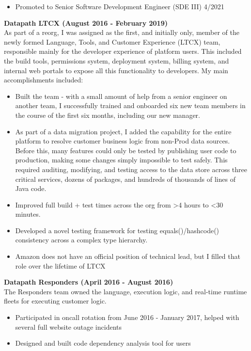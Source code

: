 \documentclass{res}
\begin{document}
\begin{resume}
\begin{itemize}
   \item Promoted to Senior Software Development Engineer (SDE III) 4/2021
   \end{itemize}
   {\bf Datapath LTCX (August 2016 - February 2019) }\\
   As part of a reorg, I was assigned as the first, and initially only, member of the newly formed Language, Tools, and Customer Experience (LTCX) team, responsible mainly for the developer experience of platform users.  This included the build tools, permissions system, deployment system, billing system, and internal web portals to expose all this functionality to developers.  My main accomplishments included:
   \begin{itemize}
   \item Built the team - with a small amount of help from a senior engineer on another team, I successfully trained and onboarded six new team members in the course of the first six months, including our new manager.
   \item As part of a data migration project, I added the capability for the entire platform to resolve customer business logic from non-Prod data sources.  Before this, many features could only be tested by publishing user code to production, making some changes simply impossible to test safely.  This required auditing, modifying, and testing access to the data store across three critical services, dozens of packages, and hundreds of thousands of lines of Java code.
   \item Improved full build + test times across the org from >4 hours to <30 minutes.
   \item Developed a novel testing framework for testing equals()/hashcode() consistency across a complex type hierarchy.
   \item Amazon does not have an official position of technical lead, but I filled that role over the lifetime of LTCX
   \end{itemize}
   {\bf Datapath Responders (April 2016 - August 2016) }\\
   The Responders team owned the language, execution logic, and real-time runtime fleets for executing customer logic.
   \begin{itemize}
   \item Participated in oncall rotation from June 2016 - January 2017, helped with several full website outage incidents
   \item Designed and built code dependency analysis tool for users
   \end{itemize}

\end{resume}
\end{document}
